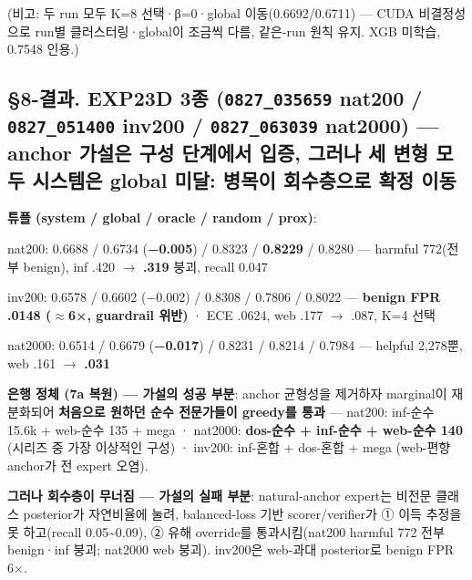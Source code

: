 (비고: 두 run 모두 K=\allowbreak{}8 선택·β=\allowbreak{}0·global 이동(0.6692/\allowbreak{}0.6711) — CUDA 비결정성으로 run별 클러스터링·global이 조금씩 다름, 같은-run 원칙 유지. XGB 미학습, 0.7548 인용.)

\subsection{§8-결과. EXP23D 3종 (\texttt{0827\_\allowbreak{}\allowbreak{}035\allowbreak{}659} nat200 /\allowbreak{} \texttt{0827\_\allowbreak{}\allowbreak{}051\allowbreak{}400} inv200 /\allowbreak{} \texttt{0827\_\allowbreak{}\allowbreak{}063\allowbreak{}039} nat2000) — \textbf{anchor 가설은 구성 단계에서 입증, 그러나 세 변형 모두 시스템은 global 미달: 병목이 회수층으로 확정 이동}}
\textbf{튜플 (system /\allowbreak{} global /\allowbreak{} oracle /\allowbreak{} random /\allowbreak{} prox)}:

\par\noindent \textbullet\enspace nat200: 0.6688 /\allowbreak{} 0.6734 (\textbf{−0.005}) /\allowbreak{} 0.8323 /\allowbreak{} \textbf{0.8229} /\allowbreak{} 0.8280 — harmful 772(전부 benign), inf .420 \ensuremath{\rightarrow} \textbf{.319} 붕괴, recall 0.047


\par\noindent \textbullet\enspace inv200: 0.6578 /\allowbreak{} 0.6602 (−0.002) /\allowbreak{} 0.8308 /\allowbreak{} 0.7806 /\allowbreak{} 0.8022 — \textbf{benign FPR .0148 (\ensuremath{\approx}6×, guardrail 위반)} · ECE .0624, web .177 \ensuremath{\rightarrow} .087, K=\allowbreak{}4 선택


\par\noindent \textbullet\enspace nat2000: 0.6514 /\allowbreak{} 0.6679 (\textbf{−0.017}) /\allowbreak{} 0.8231 /\allowbreak{} 0.8214 /\allowbreak{} 0.7984 — helpful 2,278뿐, web .161 \ensuremath{\rightarrow} \textbf{.031}


\textbf{은행 정체 (7a 복원) — 가설의 성공 부분}: anchor 균형성을 제거하자 marginal이 재분화되어 \textbf{처음으로 원하던 순수 전문가들이 greedy를 통과} — nat200: inf-순수 15.6k +\allowbreak{} web-순수 135 +\allowbreak{} mega · nat2000: \textbf{dos-순수 +\allowbreak{} inf-순수 +\allowbreak{} web-순수 140} (시리즈 중 가장 이상적인 구성) · inv200: inf-혼합 +\allowbreak{} dos-혼합 +\allowbreak{} mega (web-편향 anchor가 전 expert 오염).

\textbf{그러나 회수층이 무너짐 — 가설의 실패 부분}: natural-anchor expert는 비전문 클래스 posterior가 자연비율에 눌려, balanced-loss 기반 scorer/\allowbreak{}verifier가 ① 이득 추정을 못 하고(recall 0.05\textasciitilde{}0.09), ② 유해 override를 통과시킴(nat200 harmful 772 전부 benign·inf 붕괴; nat2000 web 붕괴). inv200은 web-과대 posterior로 benign FPR 6×.

